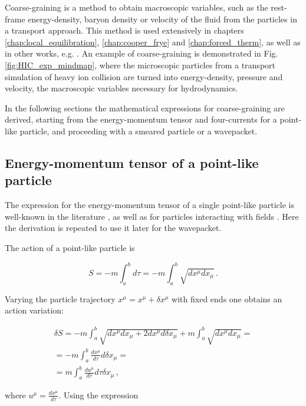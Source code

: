Coarse-graining is a method to obtain macroscopic variables, such as
the rest-frame energy-density, baryon density or velocity of the fluid from
the particles in a transport approach. This method is used extensively in chapters
\ref{chap:local_equilibration}, \ref{chap:cooper_frye} and \ref{chap:forced_therm}, as
well as in other works, e.g. \cite{Huovinen:2002im,Endres:2014zua}.
An example of coarse-graining is demonstrated in Fig. \ref{fig:HIC_exp_mindmap},
where the microscopic particles from a transport simulation of heavy ion collision are
turned into energy-density, pressure and velocity, the macroscopic variables necessary
for hydrodynamics.

In the following sections the mathematical expressions for coarse-graining are derived,
starting from the energy-momentum tensor and four-currents for a point-like particle,
and proceeding with a smeared particle or a wavepacket.

\subsection{Energy-momentum tensor of a point-like particle}

The expression for the energy-momentum tensor of a single point-like particle is
well-known in the literature \cite{LL_ED}, as well as for particles interacting
with fields \cite{Sutherland:2015}. Here the derivation is repeated to use it
later for the wavepacket.

The action of a point-like particle is

\begin{equation}
  S = -m \int_a^b d\tau = -m \int_a^b \sqrt{dx^{\mu}dx_{\mu}} \,.
\end{equation}

Varying the particle trajectory $x^{\mu} = x^{\mu} + \delta x^{\mu}$ with
fixed ends one obtains an action variation:

\begin{align}
  \delta S = -m \int_a^b \sqrt{dx^{\mu}dx_{\mu} + 2 dx^{\mu} d\delta x_{\mu}} +
             m \int_a^b \sqrt{dx^{\mu}dx_{\mu}} = \nonumber \\
             = -m \int_a^b \frac{dx^{\mu}}{d\tau} d\delta x_{\mu} = \nonumber \\
             = m \int_a^b \frac{du^{\mu}}{d\tau} d\tau \delta x_{\mu} \,,
\end{align}

where $u^{\mu} = \frac{dx^{\mu}}{d\tau}$. Using the expression

